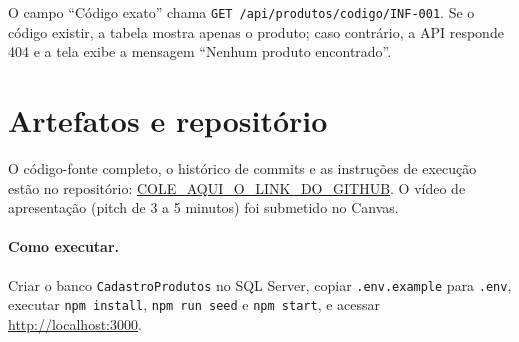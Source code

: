 \documentclass[12pt]{article}
\begin{document}
O campo ``Código exato'' chama \texttt{GET /api/produtos/codigo/INF-001}. Se o código existir, a tabela mostra apenas o produto; caso contrário, a API responde 404 e a tela exibe a mensagem ``Nenhum produto encontrado''.

\section{Artefatos e repositório}

O código-fonte completo, o histórico de commits e as instruções de execução estão no repositório: \url{COLE_AQUI_O_LINK_DO_GITHUB}. O vídeo de apresentação (pitch de 3 a 5 minutos) foi submetido no Canvas.

\paragraph{Como executar.} Criar o banco \texttt{CadastroProdutos} no SQL Server, copiar \texttt{.env.example} para \texttt{.env}, executar \texttt{npm install}, \texttt{npm run seed} e \texttt{npm start}, e acessar \url{http://localhost:3000}.
\end{document}
